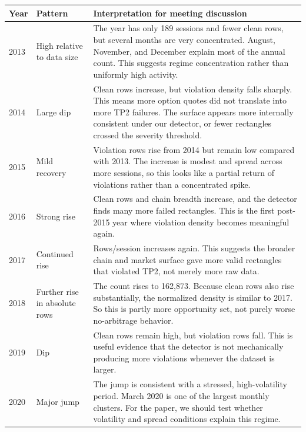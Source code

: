 \documentclass[11pt]{article}
\begin{document}
\begin{center}
\scriptsize
\begin{tabular}{p{}p{}p{}}
\toprule
Year & Pattern & Interpretation for meeting discussion \\
\midrule
2013 & High relative to data size &
The year has only 189 sessions and fewer clean rows, but several months are
very concentrated. August, November, and December explain most of the annual
count. This suggests regime concentration rather than uniformly high activity. \\

2014 & Large dip &
Clean rows increase, but violation density falls sharply. This means more
option quotes did not translate into more TP2 failures. The surface appears
more internally consistent under our detector, or fewer rectangles crossed the
severity threshold. \\

2015 & Mild recovery &
Violation rows rise from 2014 but remain low compared with 2013. The increase
is modest and spread across more sessions, so this looks like a partial return
of violations rather than a concentrated spike. \\

2016 & Strong rise &
Clean rows and chain breadth increase, and the detector finds many more failed
rectangles. This is the first post-2015 year where violation density becomes
meaningful again. \\

2017 & Continued rise &
Rows/session increases again. This suggests the broader chain and market
surface gave more valid rectangles that violated TP2, not merely more raw data. \\

2018 & Further rise in absolute rows &
The count rises to 162,873. Because clean rows also rise substantially, the
normalized density is similar to 2017. So this is partly more opportunity set,
not purely worse no-arbitrage behavior. \\

2019 & Dip &
Clean rows remain high, but violation rows fall. This is useful evidence that
the detector is not mechanically producing more violations whenever the dataset
is larger. \\

2020 & Major jump &
The jump is consistent with a stressed, high-volatility period. March 2020 is
one of the largest monthly clusters. For the paper, we should test whether
volatility and spread conditions explain this regime. \\


\end{tabular}
\end{center}
\end{document}
